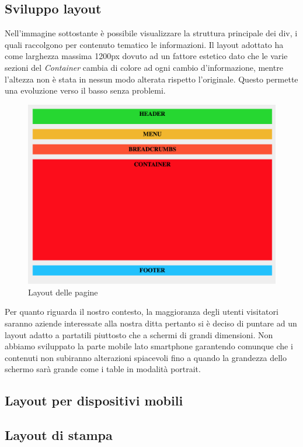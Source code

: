 \documentclass[11pt]{article}
\begin{document}
\subsection{Sviluppo layout}
Nell'immagine sottostante è possibile visualizzare la struttura principale dei div, i quali raccolgono per contenuto tematico le informazioni.
Il layout adottato ha come larghezza massima 1200px dovuto ad un fattore estetico dato che le varie sezioni del \textit{Container} cambia di colore ad ogni cambio d'informazione, mentre l'altezza non è stata in nessun modo alterata rispetto l'originale. Questo permette una evoluzione verso il basso senza problemi.
\begin{figure}[H]	
	\centering
	\includegraphics[width=\linewidth]{layout.png}
	\caption{Layout delle pagine}
	\label{Layout delle pagine}
\end{figure}

Per quanto riguarda il nostro contesto, la maggioranza degli utenti visitatori saranno aziende interessate alla nostra ditta pertanto si è deciso di puntare ad un layout adatto a partatili piuttosto che a schermi di grandi dimensioni. Non abbiamo sviluppato la parte mobile lato smartphone garantendo comunque che i contenuti non subiranno alterazioni spiacevoli fino a quando la grandezza dello schermo sarà grande come i table in modalità portrait. 
\subsection{Layout per dispositivi mobili}
\subsection{Layout di stampa}
\end{document}

